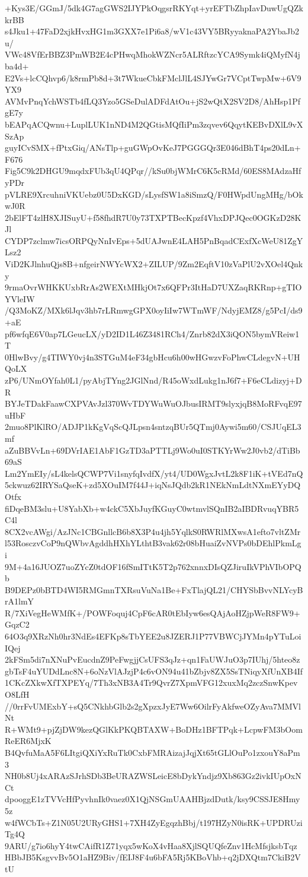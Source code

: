 +Kys3E/GGmJ/5dk4G7agGWS2IJYPkOqgsrRKYqt+yrEFTbZhpIavDuwUgQZkkrBB
s4Jku1+47FaD2xjkHvxHG1m3GXX7e1Pi6a8/wV1c43VY5BRyyaknaPA2YbaJb2u/
VWc48VfErBBZ3PmWB2E4cPHwqMhokWZNcr5ALRftzcYCA9Symk4iQMyfN4jba4d+
E2Vs+lcCQhvp6/k8rmPb8d+3t7WkueCbkFMclJlL4SJYwGr7VCptTwpMw+6V9YX9
AVMvPnqYchWSTb4fLQ3Yzo5GSeDulADFdAtOu+jS2wQtX2SV2D8/AhHsp1PfgE7y
bEAPqACQwnu+LuplLUK1nND4M2QGtisMQfIiPm3zqvev6QqytKEBvDXlL9vXSzAp
guyICvSMX+fPtxGiq/ANsTlp+guGWpOvKeJ7PGGGQr3E046dBhT4ps20dLn+F676
Fig5C9k2DHGU9mqdxFUb3qU4QPqr//kSu0bjWMrC6K5cRMd/60ES8MAdzaHfyPDr
pVLRE9XrcuhniVKUebz0U5DxKGD/sLysfSW1a8iSmzQ/F0HWpdUngMHg/bOkwJ0R
2bElFT4zlH8XJISuyU+f58fhdR7U0y73TXPTBecKpzf4VhxDPJQec0OGKzD28KJl
CYDP7zclmw7icsORPQyNnIvEps+5dUAJwnE4LAH5PnBqadCExfXcWeU81ZgYLsz2
ViD2KJlnhuQjs8B+nfgeirNWYcWX2+ZILUP/9Zm2EqftV10zVaPlU2vXOel4Qnky
9rmaOvrWHKKUxbRrAs2WEXtMHkjOt7x6QFPr3ItHaD7UXZaqRKRnp+gTIOYVleIW
/Q3MoKZ/MXk6lJqv3hb7rLRmwgGPX0oyIiIw7WTmWF/NdyjEMZ8/g5PcI/ds9+aE
pf6wfqE6V0ap7LGeucLX/yD2ID1L46Z3481RCh4/Znrb82dX3iQON5bymVReiw1T
0HlwBvy/g4TIWY0vj4n3STGuM4eF34gbHcu6h00wHGwzvFoPhwCLdegvN+UHQoLX
zP6/UNmOYfah0L1/pyAbjTYng2JGlNnd/R45oWxdLukg1nJ6f7+F6eCLdizyj+DR
BYJeTDakFaawCXPVAvJzl370WvTDYWuWuOJbusIRMT9slyxjqB8MoRFvqE97uHbF
2muo8PlKlRO/ADJP1kKgVqScQJLpsn4sntzqBUr5QTmj0Aywi5m60/CSJUqEL3mf
aZuBBVvLn+69DVrIAE1AbF1GzTD3aPTTLj9Wo0uI0STKYrWw2J0vb2/dTiBb69aS
Lm2YmEIy/sL4kelsQCWP7Vi1snyfqIvdfX/yt4/UD0WgxJvtL2k8F1iK+tVEd7nQ
5ckwuz62IRYSaQseK+zd5XOuIM7f44J+iqNsJQdb2kR1NEkNmLdtNXmEYyDQOtfx
fiDqeBM3slu+U8YabXb+w4ckC5XbJuyfKGuyC0wtmvlSQnIB2aIBDRvuqYBR5C4l
8CX2vcAWgi/AzJNc1CBGnllcB6b8X3P4u4jh5YqlkS0RWRlMXwsA1efto7vltZMr
l53RosczvCoP9nQWbvAgddhHXhYLthtB3vak62r08bHuaiZvNVPs0bDEhlPkmLgi
9M+4a16JUOZ7uoZYcZ0tdOF16fSmITtK5T2p762xnnxDIsQZJiruIkVPhVIbOPQb
B9DEPz0bBTD4WI5RMGmnTXRsuVuNa1Be+FxTlajQL21/CHYSbBvvNLYcyBrA1lmY
R/7XiVegHeWMfK+/POWFoquj4CpF6cAR0tEbIyw6esQAjAoHZjpWeR8FW9+GqzC2
64O3q9XRzNh0hr3NdEs4EFKp8sTbYEE2u8JZERJ1P77VBWCjJYMn4pYTuLoiIQej
2kFSm5di7nXNuPvEucdnZ9PeFwgjjCsUFS3qJz+qn1FaUWJuO3p7IUhj/5hteo8z
gbTsF4uYUDdLnc8N+6oNzVlAJzjP4c6vON94u41bZbjv8ZX5SsTNiqyXfUnXB4If
1CKcZXkwXfTXPEYq/7Th3xNB3A4Tr9QvrZ7XpmVFG12xuxMq2zczSnwKpevO8LfH
//0rrFvUMExbY+sQ5CNkhbGlb2s2gXpzxJyE7Ww6OilrFyAkfweOZyAva7MMVlNt
R+WMt9+pjZjDW9kezQGlKkPKQBTAXW+BoDHz1BFTPqk+LcpwFM3bOomReER6MjxK
B4QvfuMaA5F6LItgiQXiYxRuTk0CxbFMRAizajJqjXt65tGLlOuPo1zxouY8aPm3
NH0b8Uj4xARAzSJrhSDb3BeURAZWSLeicE8bDykYndjz9Xb863Gz2ivkIUpOxNCt
dpooggE1zTVVcHfPyvhnIk0vaez0X1QjNSGmUAAHBjzdDutk/ksy9CSSJE8Hmy5z
w4fWCbTs+Z1N05U2URyGHS1+7XH4ZyEgqzhBbj/t197HZyN0isRK+UPDRUziTg4Q
9ARU/g7io6hyY4twCAifR1Z71yqx5wKoX4vHaa8XjlSQUQfeZnv1HcMfsjksbTqz
HBbJB5KsgvvBv5O1aHZ9Biv/fEIJ8F4u6bFA5Rj5KBoVhb+q2jDXQtm7CkiB2VtU

